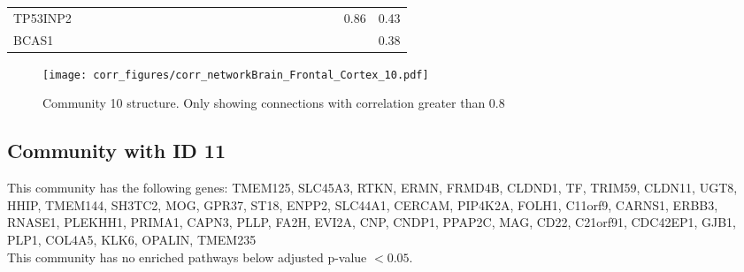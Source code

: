 \begin{longtable}{lrrrrrrrrrrrrrrrrrrrrrrr}
TP53INP2 &              &              &            &            &            &             &               &             &             &              &             &                &            &            &              &                &             &               &             &           &                &        0.86 &          0.43 \\
BCAS1    &              &              &            &            &            &             &               &             &             &              &             &                &            &            &              &                &             &               &             &           &                &             &          0.38 \\
\end{longtable}


\begin{figure}[h!]
\centering
\texttt{[image: corr\_figures/corr\_networkBrain\_Frontal\_Cortex\_10.pdf]}
\caption{Community 10 structure. Only showing connections with correlation greater than 0.8}
\end{figure}




\subsection*{Community with ID 11}
This community has the following genes: TMEM125, SLC45A3, RTKN, ERMN, FRMD4B, CLDND1, TF, TRIM59, CLDN11, UGT8, HHIP, TMEM144, SH3TC2, MOG, GPR37, ST18, ENPP2, SLC44A1, CERCAM, PIP4K2A, FOLH1, C11orf9, CARNS1, ERBB3, RNASE1, PLEKHH1, PRIMA1, CAPN3, PLLP, FA2H, EVI2A, CNP, CNDP1, PPAP2C, MAG, CD22, C21orf91, CDC42EP1, GJB1, PLP1, COL4A5, KLK6, OPALIN, TMEM235
\\
This community has no enriched pathways below adjusted p-value $< 0.05$.

